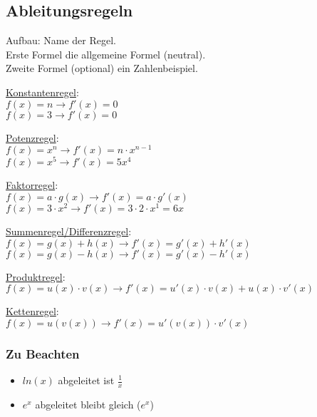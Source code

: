 \subsection{Ableitungsregeln}
\label{sec:ableitungs_regeln}
Aufbau: Name der Regel. \\
Erste Formel die allgemeine Formel (neutral). \\
Zweite Formel (optional) ein Zahlenbeispiel.

\underline{Konstantenregel}: \\
$f(x) = n \rightarrow f'(x) = 0$ \\
$f(x) = 3 \rightarrow f'(x) = 0$ 

\underline{Potenzregel}: \\
$f(x) = x^n \rightarrow f'(x) = n\cdot x^{n - 1}$ \\
$f(x) = x^5 \rightarrow f'(x) = 5x^{4}$ 

\underline{Faktorregel}: \\
$f(x) = a\cdot g(x) \rightarrow f'(x) = a\cdot g'(x)$ \\
$f(x) = 3\cdot x^2 \rightarrow f'(x) = 3\cdot 2\cdot x^1 = 6x$ 

\underline{Summenregel/Differenzregel}: \\
$f(x) = g(x) + h(x) \rightarrow f'(x) = g'(x) + h'(x)$ \\
$f(x) = g(x) - h(x) \rightarrow f'(x) = g'(x) - h'(x)$ 

\underline{Produktregel}: \\
$f(x) = u(x) \cdot v(x) \rightarrow f'(x) = u'(x) \cdot v(x) + u(x) \cdot v'(x)$ 

\underline{Kettenregel}: \\
$f(x) = u(v(x)) \rightarrow f'(x) = u'(v(x)) \cdot v'(x)$

\subsubsection{Zu Beachten}
\begin{itemize}
    \item $ln(x)$ abgeleitet ist $\frac{1}{x}$
    \item $e^x$ abgeleitet bleibt gleich ($e^x$)
\end{itemize}

